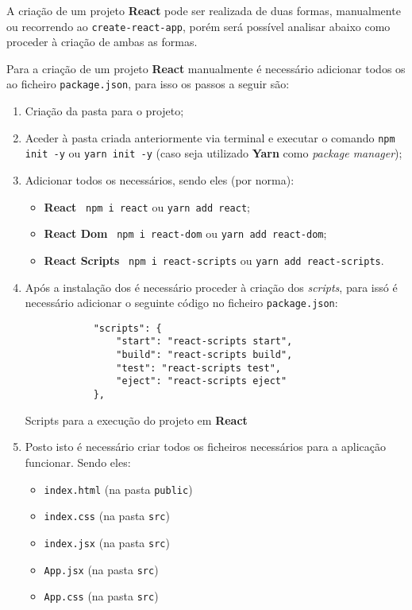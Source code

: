 
A criação de um projeto \textbf{React} pode ser realizada de duas formas, manualmente ou recorrendo ao \texttt{create-react-app}, porém será possível analisar abaixo como proceder à criação de ambas as formas.

Para a criação de um projeto \textbf{React} manualmente é necessário adicionar todos os \textit{} ao ficheiro \texttt{package.json}, para isso os passos a seguir são:

\begin{enumerate}
	\item Criação da pasta para o projeto;
	\item Aceder à pasta criada anteriormente via terminal e executar o comando \texttt{npm init -y} ou \texttt{yarn init -y} {\scriptsize (caso seja utilizado \textbf{Yarn} como \textit{package manager})};
	\item Adicionar todos os \textit{} necessários, sendo eles {\scriptsize (por norma)}:
	\begin{itemize}
		\item \textbf{React} \textemdash~\texttt{npm i react} ou \texttt{yarn add react};
		\item \textbf{React Dom} \textemdash~\texttt{npm i react-dom} ou \texttt{yarn add react-dom};
		\item \textbf{React Scripts} \textemdash~\texttt{npm i react-scripts} ou \texttt{yarn add react-scripts}.
	\end{itemize}
	\item Após a instalação dos \textit{} é necessário proceder à criação dos \textit{scripts}, para issó é necessário adicionar o seguinte código no ficheiro \texttt{package.json}:

	\begin{longlisting}
		\begin{verbatim}
			"scripts": {
				"start": "react-scripts start",
				"build": "react-scripts build",
				"test": "react-scripts test",
				"eject": "react-scripts eject"
			},
		\end{verbatim}
		\caption{Scripts para a execução do projeto em \textbf{React}}
	\end{longlisting}

	\item Posto isto é necessário criar todos os ficheiros necessários para a aplicação funcionar. Sendo eles:
	\begin{itemize}
		\item \texttt{index.html} {\scriptsize (na pasta \texttt{public})}
		\item \texttt{index.css} {\scriptsize (na pasta \texttt{src})}
		\item \texttt{index.jsx} {\scriptsize (na pasta \texttt{src})}
		\item \texttt{App.jsx} {\scriptsize (na pasta \texttt{src})}
		\item \texttt{App.css} {\scriptsize (na pasta \texttt{src})}
	\end{itemize}


\end{enumerate}
